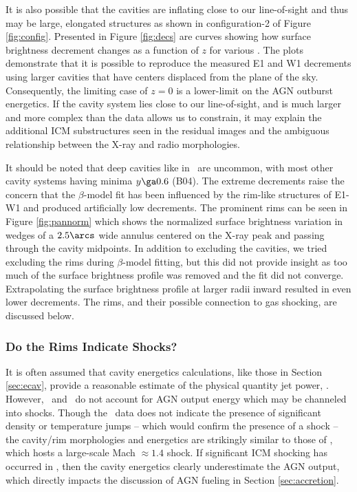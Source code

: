 \documentclass[11pt, preprint]{aastex}
\begin{document}
It is also possible that the cavities are inflating close to our
line-of-sight and thus may be large, elongated structures as shown in
configuration-2 of Figure \ref{fig:config}. Presented in Figure
\ref{fig:decs} are curves showing how surface brightness decrement
changes as a function of $z$ for various \rlos. The plots demonstrate
that it is possible to reproduce the measured E1 and W1 decrements
using larger cavities that have centers displaced from the plane of
the sky. Consequently, the limiting case of $z = 0$ is a lower-limit
on the AGN outburst energetics. If the cavity system lies close to our
line-of-sight, and is much larger and more complex than the data
allows us to constrain, it may explain the additional ICM
substructures seen in the residual images and the ambiguous
relationship between the X-ray and radio morphologies.

It should be noted that deep cavities like in \rbs\ are uncommon, with
most other cavity systems having minima $y \ga 0.6$ (B04). The extreme
decrements raise the concern that the $\beta$-model fit has been
influenced by the rim-like structures of E1-W1 and produced
artificially low decrements. The prominent rims can be seen in Figure
\ref{fig:pannorm} which shows the normalized surface brightness
variation in wedges of a $2.5\arcs$ wide annulus centered on the X-ray
peak and passing through the cavity midpoints. In addition to
excluding the cavities, we tried excluding the rims during
$\beta$-model fitting, but this did not provide insight as too much of
the surface brightness profile was removed and the fit did not
converge. Extrapolating the surface brightness profile at larger radii
inward resulted in even lower decrements. The rims, and their possible
connection to gas shocking, are discussed below.

\subsubsection{Do the Rims Indicate Shocks?}
\label{sec:shocks}

It is often assumed that cavity energetics calculations, like those in
Section \ref{sec:ecav}, provide a reasonable estimate of the physical
quantity jet power, \pjet. However, \pcav\ and \pjet\ do not account
for AGN output energy which may be channeled into shocks. Though the
\cxo\ data does not indicate the presence of significant density or
temperature jumps -- which would confirm the presence of a shock --
the cavity/rim morphologies and energetics are strikingly similar to
those of \ms, which hosts a large-scale Mach $\approx 1.4$ shock. If
significant ICM shocking has occurred in \rbs, then the cavity
energetics clearly underestimate the AGN output, which directly
impacts the discussion of AGN fueling in Section \ref{sec:accretion}.
\end{document}
